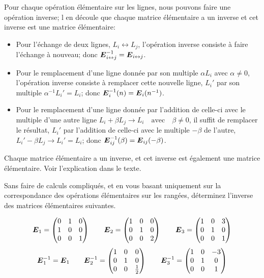 Pour chaque opération élémentaire sur les lignes, nous pouvons faire une opération inverse;  
l en découle que chaque matrice élémentaire a un inverse et cet inverse est une matrice élémentaire:
\begin{itemize}
	\item Pour l'échange de deux lignes,  \( L_i \leftrightarrow L_j\), l'opération inverse consiste à faire l'échange à nouveau;
	donc $\boldsymbol{E}_{i\leftrightarrow j}^{-1} = \boldsymbol{E}_{i\leftrightarrow j}$.
	\item Pour le remplacement d'une ligne donnée par son multiple
	\( \alpha L_i\)  avec \(\alpha \ne 0\), l'opération inverse
	consiste à remplacer cette nouvelle ligne, $L_i'$ par son multiple $\alpha^{-1}L_i' = L_i$;
	donc $\boldsymbol{E}_i^{-1}(n) = \boldsymbol{E}_i(n^{-1})$.
	\item Pour le remplacement d'une ligne donnée par l'addition de celle-ci avec le multiple d'une autre ligne
	\(L_i + \beta L_j \rightarrow L_i \quad \mbox{avec} \quad\beta \ne 0\), il suffit de remplacer le résultat, $L_i'$ par
	l'addition de celle-ci avec le multiple $-\beta$ de l'autre,
	$L_i' - \beta L_j \rightarrow L_i' = L_i$; donc $\boldsymbol{E}^{-1}_{ij}(\beta) = \boldsymbol{E}_{ij}(-\beta)$.
\end{itemize}
\begin{theo}
Chaque matrice élémentaire a un inverse, et cet inverse est également une matrice élémentaire.
\proof
Voir l'explication dans le texte.
\end{theo}
\begin{exemple}
Sans faire de calculs compliqués, et en vous basant uniquement sur la correspondance des opérations élémentaires sur les rangées, déterminez l'inverse des matrices élémentaires suivantes.

\[
\boldsymbol{E}_1 = \begin{pmatrix}
0 & 1 & 0 \\
1 & 0 & 0\\
0 & 0 & 1
\end{pmatrix}
\qquad
\boldsymbol{E}_2 = \begin{pmatrix}
1 & 0 & 0 \\
0 & 1 & 0\\
0 & 0 & 2
\end{pmatrix}
\qquad
\boldsymbol{E}_3 = \begin{pmatrix}
1 & 0 & 3 \\
0 & 1 & 0 \\
0 & 0 & 1
\end{pmatrix}
\]
\solution
\[
\boldsymbol{E}_1^{-1} = \boldsymbol{E}_1
\qquad
\boldsymbol{E}_2^{-1} = \begin{pmatrix}
1 & 0 & 0 \\
0 & 1 & 0\\
 0 & 0 & \frac{1}{2}
\end{pmatrix}
\qquad
\boldsymbol{E}_3^{-1} = \begin{pmatrix}
1 & 0 & -3 \\
0 & 1 & 0 \\
0 & 0 & 1
\end{pmatrix}
\]
\end{exemple}

